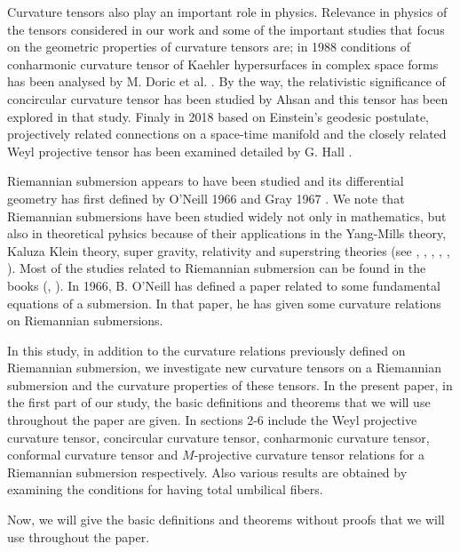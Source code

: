 \documentclass{birkjour}
\theoremstyle{definition}
\theoremstyle{remark}
\numberwithin{equation}{section}
\begin{document}
Curvature tensors also play an important role in physics. Relevance in physics of the tensors considered in our work and some of the important studies that focus on the geometric properties of curvature tensors are; in 1988 conditions of conharmonic curvature tensor of Kaehler hypersurfaces in complex space forms has been analysed by M. Doric et al. \cite{doric1}. By the way, the relativistic significance of concircular curvature tensor has been studied by Ahsan \cite{Ahsan1} and this tensor has been explored in that study. Finaly in 2018  based on Einstein’s geodesic postulate, projectively related connections on a space-time manifold and the closely related Weyl projective tensor has been examined detailed by G. Hall \cite{Hall1}.

Riemannian submersion appears to have been studied and its differential geometry has first defined by  O'Neill 1966 and  Gray 1967 \cite{O}. We note that Riemannian submersions have been studied widely not only in mathematics, but also in theoretical pyhsics because of their applications in the Yang-Mills theory, Kaluza Klein theory, super gravity, relativity and superstring theories (see \cite{BL1}, \cite{BL}, \cite{IV}, \cite{IV1}, \cite{M}, \cite{W1}). Most of the studies related to Riemannian submersion can be found in the books (\cite{FIP}, \cite{Sahin}). In 1966, B. O'Neill has defined a paper related to some fundamental equations of a submersion. In that paper, he has given some curvature relations on Riemannian submersions. 

In this study, in addition to the curvature relations previously defined on Riemannian submersion, we investigate new curvature tensors on a Riemannian submersion and the curvature properties of these tensors.
In the present paper, in the first part of our study, the basic definitions and theorems that we will use throughout the paper are given. In sections 2-6 include the Weyl projective curvature tensor, concircular curvature tensor, conharmonic curvature tensor, conformal curvature tensor and $M$-projective curvature tensor relations  for a Riemannian submersion respectively.  Also various results are obtained by examining the conditions for having total umbilical fibers.

Now, we will give the basic definitions and theorems without proofs that we will use throughout the paper.
\end{document}
